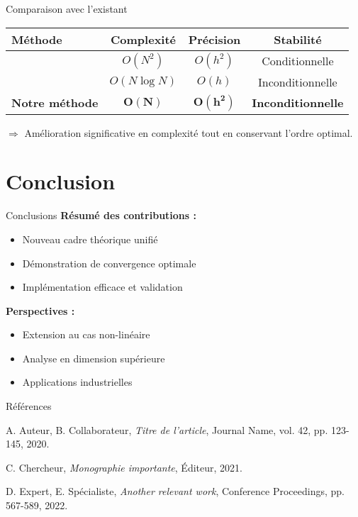 \documentclass[11pt, aspectratio=169, xcolor={svgnames}]{beamer}
\theoremstyle{definition}
\begin{document}
\begin{frame}{Comparaison avec l'existant}
  \begin{table}
    \centering
    \small
    \begin{tabular}{lccc}
      \toprule
      Méthode & Complexité & Précision & Stabilité \\
      \midrule
      \cite{reference1} & $O(N^2)$ & $O(h^2)$ & Conditionnelle \\
      \cite{reference2} & $O(N \log N)$ & $O(h)$ & Inconditionnelle \\
      \textbf{Notre méthode} & $\mathbf{O(N)}$ & $\mathbf{O(h^2)}$ & \textbf{Inconditionnelle} \\
      \bottomrule
    \end{tabular}
  \end{table}

  \vspace{0.5em}

  $\Rightarrow$ Amélioration significative en complexité tout en conservant l'ordre optimal.
\end{frame}

\section{Conclusion}

\begin{frame}{Conclusions}
  \textbf{Résumé des contributions :}

  \begin{itemize}
    \item Nouveau cadre théorique unifié
    \item Démonstration de convergence optimale
    \item Implémentation efficace et validation
  \end{itemize}

  \vspace{1em}

  \textbf{Perspectives :}

  \begin{itemize}
    \item Extension au cas non-linéaire
    \item Analyse en dimension supérieure
    \item Applications industrielles
  \end{itemize}
\end{frame}

\begin{frame}[allowframebreaks]{Références}
  \footnotesize
  \begin{thebibliography}{99}
     A. Auteur, B. Collaborateur,
      \emph{Titre de l'article},
      Journal Name, vol. 42, pp. 123-145, 2020.

     C. Chercheur,
      \emph{Monographie importante},
      Éditeur, 2021.

     D. Expert, E. Spécialiste,
      \emph{Another relevant work},
      Conference Proceedings, pp. 567-589, 2022.
  \end{thebibliography}
\end{frame}
\end{document}
